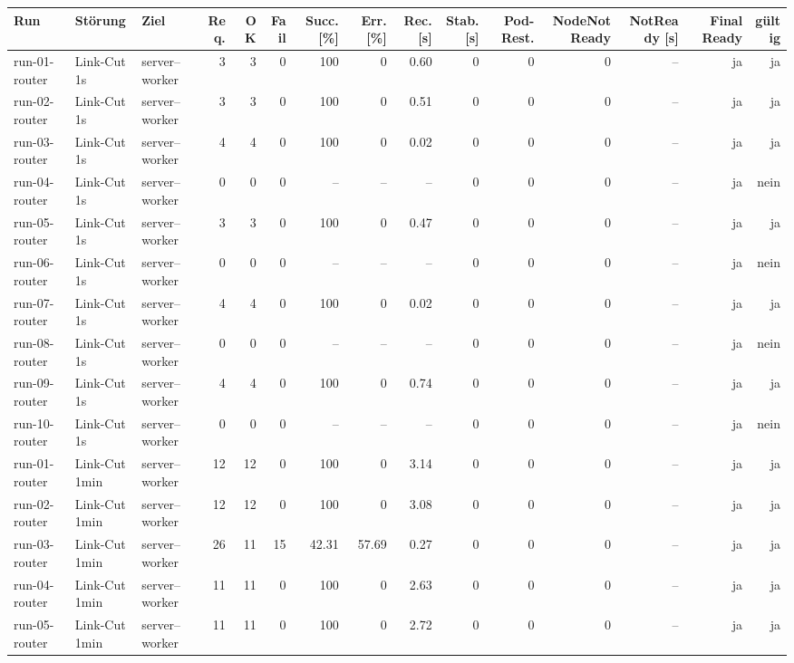 \begin{table}
\centering
\scriptsize
\setlength{\tabcolsep}{3pt}
\renewcommand{\arraystretch}{1.08}
\begin{tabular}{l l p{3.2cm} r r r r r r r r r r r r}
\toprule
Run & Störung & Ziel & Req. & OK & Fail & Succ. [\%] & Err. [\%] & Rec. [s] & Stab. [s] & Pod-Rest. & NodeNotReady & NotReady [s] & Final Ready & gültig \\
\midrule
run-01-router & Link-Cut 1s & server--worker & 3 & 3 & 0 & 100 & 0 & 0.60 & 0 & 0 & 0 & -- & ja & ja \\
run-02-router & Link-Cut 1s & server--worker & 3 & 3 & 0 & 100 & 0 & 0.51 & 0 & 0 & 0 & -- & ja & ja \\
run-03-router & Link-Cut 1s & server--worker & 4 & 4 & 0 & 100 & 0 & 0.02 & 0 & 0 & 0 & -- & ja & ja \\
run-04-router & Link-Cut 1s & server--worker & 0 & 0 & 0 & -- & -- & -- & 0 & 0 & 0 & -- & ja & nein \\
run-05-router & Link-Cut 1s & server--worker & 3 & 3 & 0 & 100 & 0 & 0.47 & 0 & 0 & 0 & -- & ja & ja \\
run-06-router & Link-Cut 1s & server--worker & 0 & 0 & 0 & -- & -- & -- & 0 & 0 & 0 & -- & ja & nein \\
run-07-router & Link-Cut 1s & server--worker & 4 & 4 & 0 & 100 & 0 & 0.02 & 0 & 0 & 0 & -- & ja & ja \\
run-08-router & Link-Cut 1s & server--worker & 0 & 0 & 0 & -- & -- & -- & 0 & 0 & 0 & -- & ja & nein \\
run-09-router & Link-Cut 1s & server--worker & 4 & 4 & 0 & 100 & 0 & 0.74 & 0 & 0 & 0 & -- & ja & ja \\
run-10-router & Link-Cut 1s & server--worker & 0 & 0 & 0 & -- & -- & -- & 0 & 0 & 0 & -- & ja & nein \\
run-01-router & Link-Cut 1min & server--worker & 12 & 12 & 0 & 100 & 0 & 3.14 & 0 & 0 & 0 & -- & ja & ja \\
run-02-router & Link-Cut 1min & server--worker & 12 & 12 & 0 & 100 & 0 & 3.08 & 0 & 0 & 0 & -- & ja & ja \\
run-03-router & Link-Cut 1min & server--worker & 26 & 11 & 15 & 42.31 & 57.69 & 0.27 & 0 & 0 & 0 & -- & ja & ja \\
run-04-router & Link-Cut 1min & server--worker & 11 & 11 & 0 & 100 & 0 & 2.63 & 0 & 0 & 0 & -- & ja & ja \\
run-05-router & Link-Cut 1min & server--worker & 11 & 11 & 0 & 100 & 0 & 2.72 & 0 & 0 & 0 & -- & ja & ja \\

\end{tabular}
\end{table}
